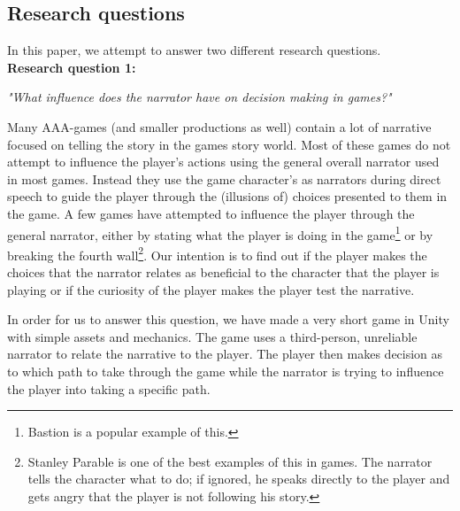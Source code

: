 \subsection{Research questions}
\label{Method_Research}

In this paper, we attempt to answer two different research questions.\\

\textbf{Research question 1:}
\begin{center}
\textit{"What influence does the narrator have on decision making in games?"}
\end{center}
Many AAA-games (and smaller productions as well) contain a lot of narrative focused on telling the story in the games story world. Most of these games do not attempt to influence the player's actions using the general overall narrator used in most games. Instead they use the game character's as narrators during direct speech to guide the player through the (illusions of) choices presented to them in the game. A few games have attempted to influence the player through the general narrator, either by stating what the player is doing in the game\footnote{Bastion is a popular example of this.} or by breaking the fourth wall\footnote{Stanley Parable is one of the best examples of this in games. The narrator tells the character what to do; if ignored, he speaks directly to the player and gets angry that the player is not following his story.}. Our intention is to find out if the player makes the choices that the narrator relates as beneficial to the character that the player is playing or if the curiosity of the player makes the player test the narrative.

In order for us to answer this question, we have made a very short game in Unity with simple assets and mechanics. The game uses a third-person, unreliable narrator to relate the narrative to the player. The player then makes decision as to which path to take through the game while the narrator is trying to influence the player into taking a specific path.

